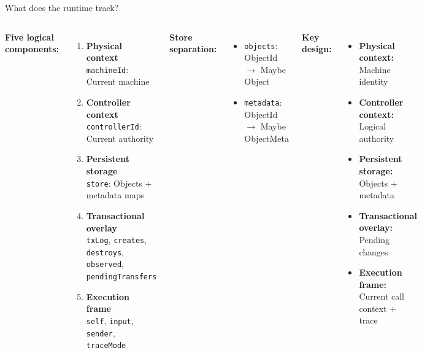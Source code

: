 \documentclass[handout,aspectratio=169,xcolor=dvipsnames,10pt]{beamer}
\begin{document}

\begin{frame}{What does the runtime track?}

\begin{columns}[T]

\textbf{Five logical components:}

\begin{enumerate}\scriptsize
  \item \textbf{Physical context}\\
  \texttt{machineId}: Current machine

  \item \textbf{Controller context}\\
  \texttt{controllerId}: Current authority

  \item \textbf{Persistent storage}\\
  \texttt{store}: Objects + metadata maps

  \item \textbf{Transactional overlay}\\
  \texttt{txLog}, \texttt{creates}, \texttt{destroys}, \texttt{observed}, \texttt{pendingTransfers}

  \item \textbf{Execution frame}\\
  \texttt{self}, \texttt{input}, \texttt{sender}, \texttt{traceMode}
\end{enumerate}


\textbf{Store separation:}

\vspace{0.3em}

\begin{itemize}\scriptsize
  \item \texttt{objects}: ObjectId $\to$ Maybe Object
  \item \texttt{metadata}: ObjectId $\to$ Maybe ObjectMeta
\end{itemize}

\vspace{0.5em}

\textbf{Key design:}

\begin{itemize}\scriptsize
  \item \textbf{Physical context:} Machine identity
  \item \textbf{Controller context:} Logical authority
  \item \textbf{Persistent storage:} Objects + metadata
  \item \textbf{Transactional overlay:} Pending changes
  \item \textbf{Execution frame:} Current call context + trace
\end{itemize}

\end{columns}

\end{frame}
\end{document}
